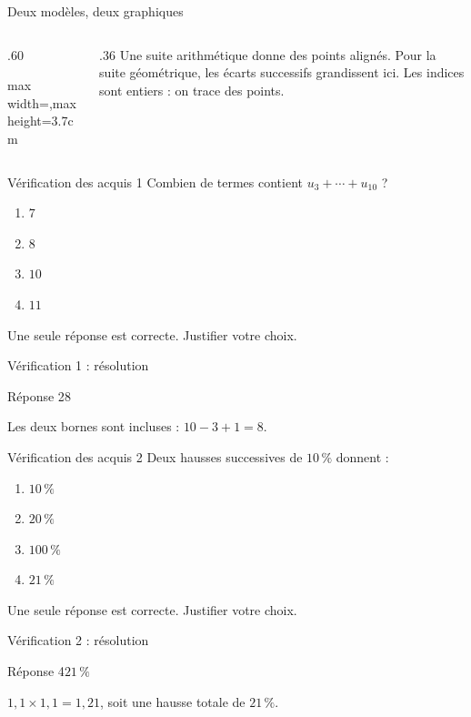 \documentclass[aspectratio=169,12pt]{beamer}
\begin{document}
\renewcommand{\slidekind}{COMPRENDRE}
\begin{frame}[t,fragile]{Deux modèles, deux graphiques}
\begin{columns}[c,onlytextwidth]\begin{column}{.60\textwidth}\centering\begin{adjustbox}{max width=\linewidth,max height=3.7cm}\end{adjustbox}\end{column}\begin{column}{.36\textwidth} Une suite arithmétique donne des points alignés. Pour la suite géométrique, les écarts successifs grandissent ici. Les indices sont entiers : on trace des points.\end{column}\end{columns}
\end{frame}
\renewcommand{\slidekind}{À VOUS DE JOUER}\begin{frame}[t]{Vérification des acquis 1}
Combien de termes contient $u_3+\cdots+u_{10}$ ?\begin{enumerate}
\item $7$
\item $8$
\item $10$
\item $11$
\end{enumerate}\medskip Une seule réponse est correcte. Justifier votre choix.\end{frame}
\renewcommand{\slidekind}{COMPRENDRE LA RÉPONSE}\begin{frame}[t]{Vérification 1 : résolution}
\begin{block}{Réponse 2}$8$\end{block}\medskip Les deux bornes sont incluses : $10-3+1=8$.\end{frame}
\renewcommand{\slidekind}{À VOUS DE JOUER}\begin{frame}[t]{Vérification des acquis 2}
Deux hausses successives de $10\,\%$ donnent :\begin{enumerate}
\item $10\,\%$
\item $20\,\%$
\item $100\,\%$
\item $21\,\%$
\end{enumerate}\medskip Une seule réponse est correcte. Justifier votre choix.\end{frame}
\renewcommand{\slidekind}{COMPRENDRE LA RÉPONSE}\begin{frame}[t]{Vérification 2 : résolution}
\begin{block}{Réponse 4}$21\,\%$\end{block}\medskip $1,1\times1,1=1,21$, soit une hausse totale de $21\,\%$.\end{frame}
\end{document}
